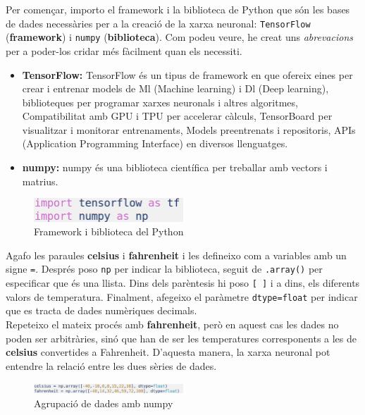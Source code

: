 Per començar, importo el framework i la biblioteca de Python que són les bases de dades necessàries per a la creació de la xarxa neuronal: \texttt{TensorFlow} (\textbf{framework}) i \texttt{{numpy}} (\textbf{biblioteca}). Com podeu veure, he creat uns \textit{abrevacions} per a poder-los cridar més fàcilment quan els necessiti.

\begin{itemize}
 \item \textbf{TensorFlow: }\label{TensorFlow} TensorFlow és un tipus de framework en que ofereix eines per crear i entrenar models de Ml (Machine learning) i Dl (Deep learning), biblioteques per programar xarxes neuronals i altres algoritmes, Compatibilitat amb GPU i TPU per accelerar càlculs, TensorBoard per visualitzar i monitorar entrenaments, Models preentrenats i repositoris, APIs (Application Programming Interface) en diversos llenguatges.
 \item \textbf{numpy: }\label{numpy} numpy és una biblioteca científica per treballar amb vectors i matrius.
\end{itemize}
\begin{figure}[H]
    \centering
    \includegraphics[width=0.5\textwidth]{./figures/1.png}
    \caption{Framework i biblioteca del Python}
\end{figure}


Agafo les paraules \textbf{celsius} i \textbf{fahrenheit} i les defineixo com a variables amb un signe \texttt{=}. Després poso \texttt{np} per indicar la biblioteca, seguit de \texttt{.array()} per especificar que és una llista. Dins dels parèntesis hi poso \texttt{[ ]} i a dins, els diferents valors de temperatura. Finalment, afegeixo el paràmetre \texttt{dtype=float} per indicar que es tracta de dades numèriques decimals.\\

Repeteixo el mateix procés amb \textbf{fahrenheit}, però en aquest cas les dades no poden ser arbitràries, sinó que han de ser les temperatures corresponents a les de \textbf{celsius} convertides a Fahrenheit. D’aquesta manera, la xarxa neuronal pot entendre la relació entre les dues sèries de dades.


\begin{figure}[H]
    \centering
    \includegraphics[width=0.5\textwidth]{./figures/2.png}
    \caption{Agrupació de dades amb numpy}
\end{figure}

